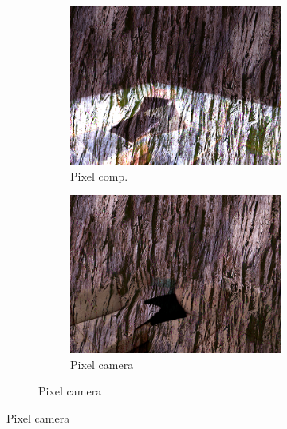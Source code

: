 \begin{figure}[]
\begin{subfigure}{\textwidth}
\begin{subfigure}{0.24\textwidth}
            \includegraphics[width=\textwidth]{images/04-experiment02/sofa/wood/pixel_im.jpg}
            \caption*{Pixel comp.}
        \end{subfigure}
        \hfill
        \begin{subfigure}{0.24\textwidth}
            \centering
            \includegraphics[width=\textwidth]{images/04-experiment02/sofa/wood/pixel_proj.jpg}
            \caption*{Pixel camera}
        \end{subfigure}


\end{subfigure}
\end{figure}
